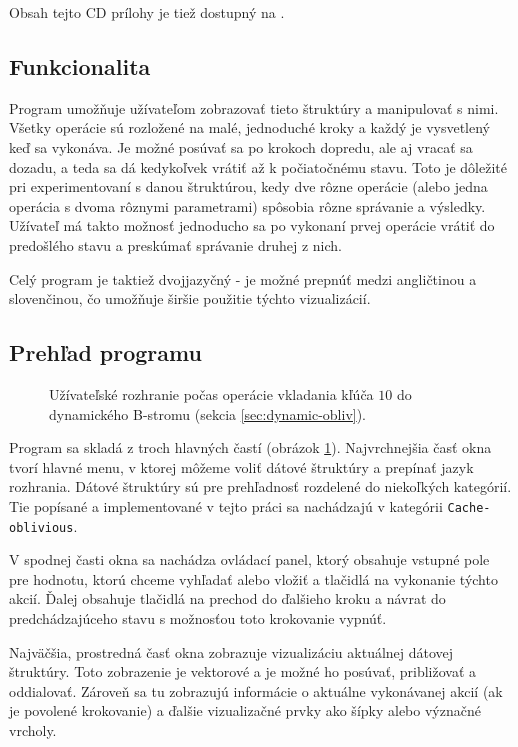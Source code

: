 Obsah tejto CD prílohy je tiež dostupný na .

\subsection{Funkcionalita}
Program umožňuje užívateľom zobrazovať tieto štruktúry a manipulovať s nimi. Všetky operácie sú rozložené na malé, jednoduché kroky a každý je vysvetlený keď sa vykonáva. Je možné posúvať sa po krokoch dopredu, ale aj vracať sa dozadu, a teda sa dá kedykoľvek vrátiť až k počiatočnému stavu. Toto je dôležité pri experimentovaní s danou štruktúrou, kedy dve rôzne operácie (alebo jedna operácia s dvoma rôznymi parametrami) spôsobia rôzne správanie a výsledky. Užívateľ má takto možnosť jednoducho sa po vykonaní prvej operácie vrátiť do predošlého stavu a preskúmať správanie druhej z nich.

Celý program je taktiež dvojjazyčný - je možné prepnúť medzi angličtinou a slovenčinou, čo umožňuje širšie použitie týchto vizualizácií.

\subsection{Prehľad programu}
\begin{figure}
    \centering
    \resizebox{0.9\textwidth}{!}{%
            
    }
    \caption[Užívateľské rozhranie]{Užívateľské rozhranie počas operácie vkladania kľúča $10$ do dynamického \obliv B-stromu (sekcia \ref{sec:dynamic-obliv}).}
    \label{fig:ss_overview}
\end{figure}

Program sa skladá z troch hlavných častí (obrázok \ref{fig:ss_overview}). Najvrchnejšia časť okna tvorí hlavné menu, v ktorej môžeme voliť dátové štruktúry a prepínať jazyk rozhrania. Dátové štruktúry sú pre prehľadnosť rozdelené do niekoľkých kategórií. Tie popísané a implementované v tejto práci sa nachádzajú v kategórii \texttt{Cache-oblivious}.

V spodnej časti okna sa nachádza ovládací panel, ktorý obsahuje vstupné pole pre hodnotu, ktorú chceme vyhľadať alebo vložiť a tlačidlá na vykonanie týchto akcií. Ďalej obsahuje tlačidlá na prechod do ďalšieho kroku a návrat do predchádzajúceho stavu s možnosťou toto krokovanie vypnúť.

Najväčšia, prostredná časť okna zobrazuje vizualizáciu aktuálnej dátovej štruktúry. Toto zobrazenie je vektorové a je možné ho posúvať, približovať a oddialovať. Zároveň sa tu zobrazujú informácie o aktuálne vykonávanej akcií (ak je povolené krokovanie) a ďalšie vizualizačné prvky ako šípky alebo význačné vrcholy.

